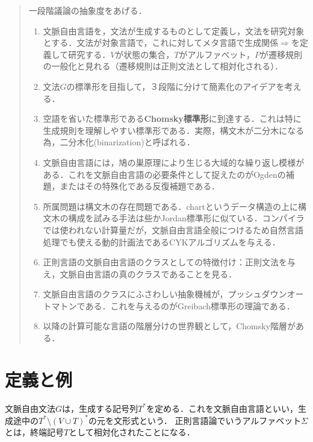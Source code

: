 \documentclass[uplatex, dvipdfmx]{jsreport}
\begin{document}
\begin{quotation}
    一段階議論の抽象度をあげる．
    \begin{enumerate}
        \item 文脈自由言語を，文法が生成するものとして定義し，文法を研究対象とする．文法が対象言語で，これに対してメタ言語で生成関係$\Rightarrow$を定義して研究する．$V$が状態の集合，$T$がアルファベット，$P$が遷移規則の一般化と見れる（遷移規則は正則文法として相対化される）．
        \item 文法$G$の標準形を目指して，３段階に分けて簡素化のアイデアを考える．
        \item 空語を省いた標準形である\textbf{Chomsky標準形}に到達する．これは特に生成規則を理解しやすい標準形である．実際，構文木が二分木になる為，二分木化(binarization)と呼ばれる．
        \item 文脈自由言語には，鳩の巣原理により生じる大域的な繰り返し模様がある．これを文脈自由言語の必要条件として捉えたのがOgdenの補題，またはその特殊化である反復補題である．
        \item 所属問題は構文木の存在問題である．chartというデータ構造の上に構文木の構成を試みる手法は些かJordan標準形に似ている．コンパイラでは使われない計算量だが，文脈自由言語全般につけるため自然言語処理でも使える動的計画法であるCYKアルゴリズムを与える．
        \item 正則言語の文脈自由言語のクラスとしての特徴付け：正則文法を与え，文脈自由言語の真のクラスであることを見る．
        \item 文脈自由言語のクラスにふさわしい抽象機械が，プッシュダウンオートマトンである．これを与えるのがGreibach標準形の理論である．
        \item 以降の計算可能な言語の階層分けの世界観として，Chomsky階層がある．
    \end{enumerate}
\end{quotation}

\section{定義と例}

\begin{tcolorbox}[colframe=ForestGreen, colback=ForestGreen!10!white, breakable]
    文脈自由文法$G$は，生成する記号列$T^*$を定める．これを文脈自由言語といい，生成途中の$T^*\setminus(V\cup T)^*$の元を文形式という．
    正則言語論でいうアルファベット$\Sigma$とは，終端記号$T$として相対化されたことになる．
\end{tcolorbox}
\end{document}
